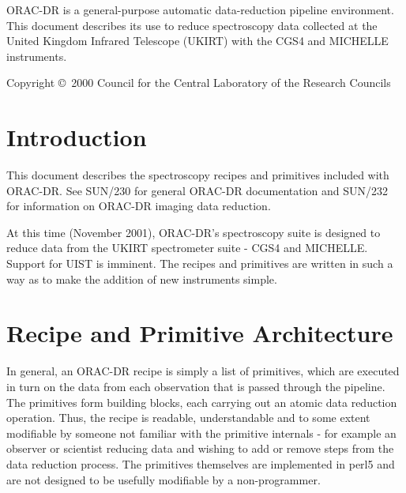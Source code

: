 \documentclass[twoside,11pt]{article}
\newcommand{\stardocinitials}  {SUN}
\newcommand{\stardoccopyright} 
{Copyright \copyright\ 2000 Council for the Central Laboratory of the Research Councils}
\newcommand{\stardocnumber}    {236.0}
\newcommand{\stardocabstract}  {ORAC-DR is a
general-purpose automatic data-reduction pipeline environment.  This
document describes its use to reduce spectroscopy data collected at the
United Kingdom Infrared Telescope (UKIRT) with the CGS4 and MICHELLE
instruments. }
\newcommand{\stardocname}{\stardocinitials /\stardocnumber}
\newenvironment{latexonly}{}{}
\newcommand{\xref}[3]{#1}
\renewcommand{\_}{\texttt{\symbol{95}}}
\renewcommand{\thepage}{\roman{page}}
\begin{document}
\stardocabstract

\begin{latexonly}
\newpage
\vspace*{\fill}
\stardoccopyright
\end{latexonly}

  \newpage
  \begin{latexonly}
    \setlength{\parskip}{0mm}
    \tableofcontents
    \setlength{\parskip}{\medskipamount}
    \markboth{\stardocname}{\stardocname}
  \end{latexonly}

\cleardoublepage
\renewcommand{\thepage}{\arabic{page}}
\setcounter{page}{1}


\section{Introduction}

This document describes the spectroscopy recipes and primitives included with
ORAC-DR. See \xref{SUN/230}{sun230}{} for general ORAC-DR documentation and
\xref{SUN/232}{sun232}{} for information on ORAC-DR imaging data reduction.

At this time (November 2001), ORAC-DR's spectroscopy suite is designed
to reduce data from the UKIRT spectrometer suite - CGS4 and
MICHELLE. Support for UIST is imminent. The recipes and primitives
are written in such a way as to make the addition of new instruments
simple.

\section{Recipe and Primitive Architecture}

In general, an ORAC-DR recipe is simply a list of primitives, which
are executed in turn on the data from each observation that is passed
through the pipeline. The primitives form building blocks, each
carrying out an atomic data reduction operation. Thus, the recipe is
readable, understandable and to some extent modifiable by someone not
familiar with the primitive internals - for example an observer or
scientist reducing data and wishing to add or remove steps from the
data reduction process. The primitives themselves are implemented in
perl5 and are not designed to be usefully modifiable by a
non-programmer.
\end{document}
